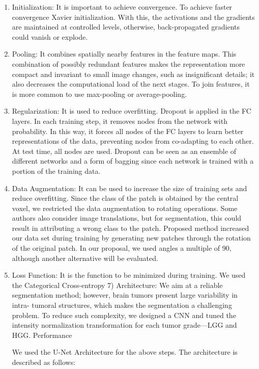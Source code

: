 \begin{enumerate}
    \item Initialization: It is important to achieve convergence. To achieve faster convergence Xavier initialization. With this, the activations and the gradients are maintained at controlled levels, otherwise, back-propagated gradients could vanish or explode.
    \item Pooling: It combines spatially nearby features in the feature maps. This combination of possibly redundant features makes the representation more compact and invariant to small image changes, such as insignificant details; it also decreases the computational load of the next stages. To join features, it is more common to use max-pooling or average-pooling.
    \item Regularization: It is used to reduce overfitting. Dropout is applied in the FC layers. In each training step, it removes nodes from the network with probability. In this way, it forces all nodes of the FC layers to learn better representations of the data, preventing nodes from co-adapting to each other. At test time, all nodes are used. Dropout can be seen as an ensemble of different networks and a form of bagging since each network is trained with a portion of the training data.
    \item Data Augmentation: It can be used to increase the size of training sets and reduce overfitting. Since the class of the patch is obtained by the central voxel, we restricted the data augmentation to rotating operations. Some authors also consider image translations, but for segmentation, this could result in attributing a wrong class to the patch. Proposed method increased our data set during training by generating new patches through the rotation of the original patch. In our proposal, we used angles a multiple of 90, although another alternative will be evaluated.
    \item Loss Function: It is the function to be minimized during training. We used the Categorical Cross-entropy
    7) Architecture: We aim at a reliable segmentation method; however, brain tumors present large variability in intra- tumoral structures, which makes the segmentation a challenging problem. To reduce such complexity, we designed a CNN and tuned the intensity normalization transformation for each tumor grade—LGG and HGG.
    Performance
    
    We used the U-Net Architecture for the above steps. The architecture is described as follows:
    

\end{enumerate}
